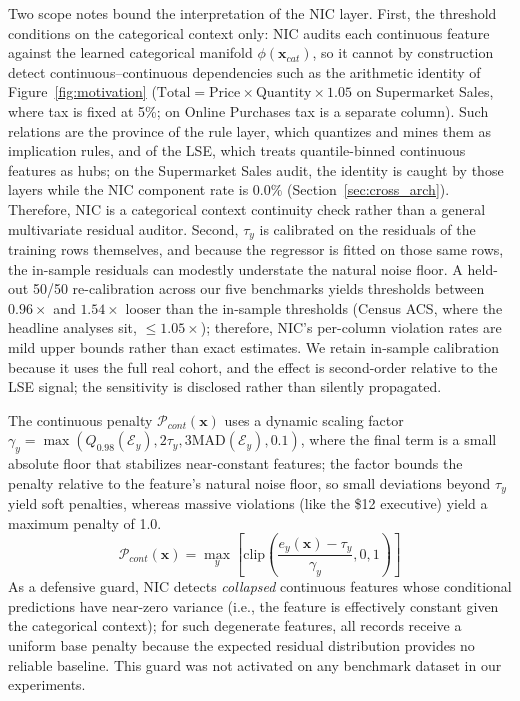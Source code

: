 \documentclass[pdflatex,sn-mathphys-num]{sn-jnl}
\theoremstyle{thmstyleone}%
\theoremstyle{thmstyletwo}%
\theoremstyle{thmstylethree}%
\begin{document}
Two scope notes bound the interpretation of the NIC layer. First, the threshold conditions on the categorical context only: NIC audits each continuous feature against the learned categorical manifold $\phi(\mathbf{x}_{cat})$, so it cannot by construction detect continuous--continuous dependencies such as the arithmetic identity of Figure~\ref{fig:motivation} ($\text{Total} = \text{Price} \times \text{Quantity} \times 1.05$ on Supermarket Sales, where tax is fixed at 5\%; on Online Purchases tax is a separate column). Such relations are the province of the rule layer, which quantizes and mines them as implication rules, and of the LSE, which treats quantile-binned continuous features as hubs; on the Supermarket Sales audit, the identity is caught by those layers while the NIC component rate is $0.0\%$ (Section~\ref{sec:cross_arch}). Therefore, NIC is a categorical context continuity check rather than a general multivariate residual auditor. Second, $\tau_y$ is calibrated on the residuals of the training rows themselves, and because the regressor is fitted on those same rows, the in-sample residuals can modestly understate the natural noise floor. A held-out 50/50 re-calibration across our five benchmarks yields thresholds between $0.96\times$ and $1.54\times$ looser than the in-sample thresholds (Census ACS, where the headline analyses sit, $\le 1.05\times$); therefore, NIC's per-column violation rates are mild upper bounds rather than exact estimates. We retain in-sample calibration because it uses the full real cohort, and the effect is second-order relative to the LSE signal; the sensitivity is disclosed rather than silently propagated.

The continuous penalty $\mathcal{P}_{cont}(\mathbf{x})$ uses a dynamic scaling factor $\gamma_y = \max(Q_{0.98}(\mathcal{E}_y), 2\tau_y, 3\text{MAD}(\mathcal{E}_y), 0.1)$, where the final term is a small absolute floor that stabilizes near-constant features; the factor bounds the penalty relative to the feature's natural noise floor, so small deviations beyond $\tau_y$ yield soft penalties, whereas massive violations (like the \$12 executive) yield a maximum penalty of 1.0.
\begin{equation}
    \mathcal{P}_{cont}(\mathbf{x}) = \max_{y} \left[ \text{clip}\left( \frac{e_y(\mathbf{x}) - \tau_y}{\gamma_y}, 0, 1 \right) \right]
\end{equation}
As a defensive guard, NIC detects \emph{collapsed} continuous features whose conditional predictions have near-zero variance (i.e., the feature is effectively constant given the categorical context); for such degenerate features, all records receive a uniform base penalty because the expected residual distribution provides no reliable baseline. This guard was not activated on any benchmark dataset in our experiments.
\end{document}
